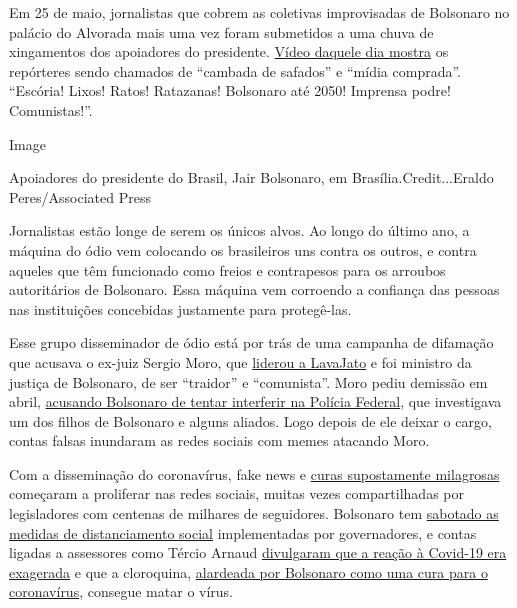 Em 25 de maio, jornalistas que cobrem as coletivas improvisadas de
Bolsonaro no palácio do Alvorada mais uma vez foram submetidos a uma
chuva de xingamentos dos apoiadores do presidente.
\href{https://twitter.com/folha/status/1264913877399212034}{Vídeo
daquele dia mostra} os repórteres sendo chamados de ``cambada de
safados'' e ``mídia comprada''. ``Escória! Lixos! Ratos! Ratazanas!
Bolsonaro até 2050! Imprensa podre! Comunistas!''.

Image

Apoiadores do presidente do Brasil, Jair Bolsonaro, em
Brasília.Credit...Eraldo Peres/Associated Press

Jornalistas estão longe de serem os únicos alvos. Ao longo do último
ano, a máquina do ódio vem colocando os brasileiros uns contra os
outros, e contra aqueles que têm funcionado como freios e contrapesos
para os arroubos autoritários de Bolsonaro. Essa máquina vem corroendo a
confiança das pessoas nas instituições concebidas justamente para
protegê-las.

Esse grupo disseminador de ódio está por trás de uma campanha de
difamação que acusava o ex-juiz Sergio Moro, que
\href{https://www.nytimes3xbfgragh.onion/2017/09/18/opinion/brazil-corruption-car-wash.html?searchResultPosition=1}{liderou
a LavaJato} e foi ministro da justiça de Bolsonaro, de ser ``traidor'' e
``comunista''. Moro pediu demissão em abril,
\href{https://www.nytimes3xbfgragh.onion/2017/09/18/opinion/brazil-corruption-car-wash.html?searchResultPosition=1}{acusando
Bolsonaro de tentar interferir na Polícia Federal}, que investigava um
dos filhos de Bolsonaro e alguns aliados. Logo depois de ele deixar o
cargo, contas falsas inundaram as redes sociais com memes atacando Moro.

Com a disseminação do coronavírus, fake news e
\href{https://www.bbc.com/news/53361876}{curas supostamente milagrosas}
começaram a proliferar nas redes sociais, muitas vezes compartilhadas
por legisladores com centenas de milhares de seguidores. Bolsonaro tem
\href{https://www.hrw.org/news/2020/04/10/brazil-bolsonaro-sabotages-anti-covid-19-efforts}{sabotado
as medidas de distanciamento social} implementadas por governadores, e
contas ligadas a assessores como Tércio Arnaud
\href{https://www.bbc.com/portuguese/brasil-53353594}{divulgaram que a
reação à Covid-19 era exagerada} e que a cloroquina,
\href{https://www.nytimes3xbfgragh.onion/2020/06/13/world/americas/virus-brazil-bolsonaro-chloroquine.html}{alardeada
por Bolsonaro como uma cura para o coronavírus}, consegue matar o vírus.

